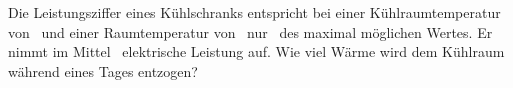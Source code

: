 Die Leistungsziffer eines Kühlschranks entspricht bei einer Kühlraumtemperatur von \tkO\ und einer Raumtemperatur von \twO\ nur \frO\ des maximal möglichen Wertes. Er nimmt im Mittel \PkO\ elektrische Leistung auf. Wie viel Wärme wird dem Kühlraum während eines Tages entzogen?
